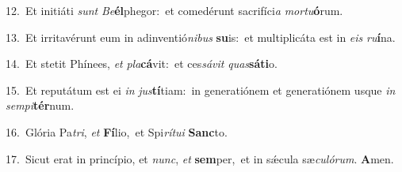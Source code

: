 {\numbfont\textcolor{\numbcolor}{12.}}~Et initiáti \textit{sunt} \textit{Be}\-\textbf{él}phegor:~\star et comedérunt sacrifíci\textit{a} \textit{mor}\-\textit{tu}\textbf{ó}rum.\par
{\numbfont\textcolor{\numbcolor}{13.}}~Et irritavérunt eum in adinventió\-\textit{ni}\-\textit{bus} \textbf{su}\-is:~\star et multiplicáta est in \textit{e}\-\textit{is} \textit{ru}\-\textbf{í}na.\par
{\numbfont\textcolor{\numbcolor}{14.}}~Et stetit Phínees, \textit{et} \textit{pla}\-\textbf{cá}vit:~\star et ces\-\textit{sá}\-\textit{vit} \textit{quas}\-\textbf{sá}\textbf{ti}o.\par
{\numbfont\textcolor{\numbcolor}{15.}}~Et reputátum est ei \textit{in} \textit{jus}\-\textbf{tí}tiam:~\star in generatiónem et generatiónem usque \textit{in} \textit{sem}\-\textit{pi}\textbf{tér}num.\par
{\numbfont\textcolor{\numbcolor}{16.}}~Glória Pa\-\textit{tri}\-, \textit{et} \textbf{Fí}\-lio,~\star et Spi\-\textit{rí}\-\textit{tu}\textit{i} \textbf{Sanc}\-to.\par
{\numbfont\textcolor{\numbcolor}{17.}}~Sicut erat in princípio, et \textit{nunc}\-, \textit{et} \textbf{sem}\-per,~\star et in sǽcula sæ\-\textit{cu}\-\textit{ló}\textit{rum}. \textbf{A}\-men.\par
